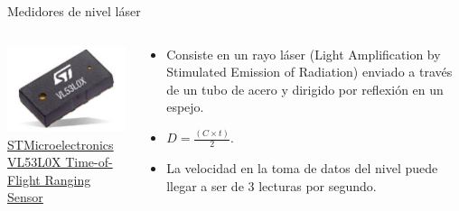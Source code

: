 \documentclass[aspectratio=169]{beamer}
\begin{document}
\begin{frame}{Medidores de nivel láser}
    \begin{columns}[c, onlytextwidth]
        \begin{column}{0.5\textwidth}
                \centering
            \includegraphics[width = 0.9\linewidth]{fig/Nivel/lasersensor.jpg}\\           \tiny{\href{https://www.mouser.com/new/stmicroelectronics/stm-vl53lox-sensor/}{STMicroelectronics VL53L0X Time-of-Flight Ranging Sensor}}
        \end{column}
        \begin{column}{0.50\textwidth}
        
            \begin{itemize}
                \item Consiste en un rayo láser (Light Amplification by Stimulated Emission of Radiation) enviado a través de un tubo de acero y dirigido por reflexión en un espejo.
                \item $D=\frac{(C \times t)}{2}$.
                \item La velocidad en la toma de datos del nivel puede llegar a ser de 3 lecturas por segundo.
                
            \end{itemize}
        
        \end{column}
    \end{columns}
\end{frame}
\end{document}
